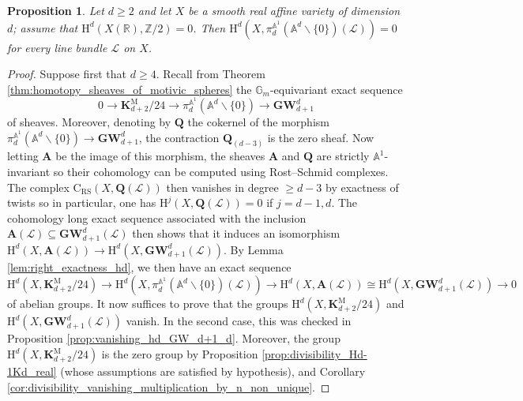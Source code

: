 \documentclass[11pt,leqno]{amsart}
\newcommand{\GW}{\mathbf{GW}}
\renewcommand{\1}{{\rm 1\hspace*{-0.4ex}%
\rule{0.1ex}{1.52ex}\hspace*{0.2ex}}}
\renewcommand{\Lc}{{\mathcal L}}
\newcommand{\Hr}{{\mathrm {H}}}
\newcommand{\<}[1]{{\langle}#1 {\rangle}}
\newcommand{\Rb}{\mathbb{R}}
\newcommand{\Abf}{\mathbf{A}}
\newcommand{\Cr}{\mathrm{C}}
\newcommand{\RS}{\mathrm{RS}}
\newcommand{\Zb}{\mathbb{Z}}
\newcommand{\Kbf}{\mathbf{K}}
\newcommand{\Abb}{\mathbb{A}}
\newcommand{\Mr}{\mathrm{M}}
\newcommand{\Qbf}{\mathbf{Q}}
\theoremstyle{plain}
\newtheorem{prop}[thm]{Proposition}
\theoremstyle{definition}
\theoremstyle{remark}
\numberwithin{equation}{section}
\begin{document}
\begin{prop}\label{prop:vanishing_cohomology_homotopy_sheaf}
Let $d\geq 2$ and let $X$ be a smooth real affine variety of dimension $d$; assume that $\Hr^d(X(\Rb),\Zb/2)=0$. Then $\Hr^d(X,\pi_d^{\Abb^1}(\Abb^d\smallsetminus \{0\})(\Lc))=0$ for every line bundle $\Lc$ on $X$.  
\end{prop}

\begin{proof}
Suppose first that $d\geq 4$. Recall from Theorem \ref{thm:homotopy_sheaves_of_motivic_spheres} the $\mathbb{G}_m$-equivariant exact sequence \[0\to\Kbf_{d+2}^\Mr/24\to\pi_d^{\Abb^1}(\Abb^d\smallsetminus \{0\})\to\GW_{d+1}^d\] of sheaves. Moreover, denoting by $\Qbf$ the cokernel of the morphism $\pi_d^{\Abb^1}(\Abb^d\smallsetminus \{0\})\to\GW_{d+1}^d$, the contraction $\Qbf_{(d-3)}$ is the zero sheaf. Now letting $\Abf$ be the image of this morphism, the sheaves $\Abf$ and $\Qbf$ are strictly $\Abb^1$-invariant so their cohomology can be computed using Rost--Schmid complexes. The complex $\Cr_\RS(X,\Qbf(\Lc))$ then vanishes in degree $\geq d-3$ by exactness of twists so in particular, one has $\Hr^j(X,\Qbf(\Lc))=0$ if $j=d-1,d$. The cohomology long exact sequence associated with the inclusion $\Abf(\Lc)\subseteq\GW_{d+1}^d(\Lc)$ then shows that it induces an isomorphism $\Hr^d(X,\Abf(\Lc))\to\Hr^d(X,\GW_{d+1}^d(\Lc))$. By Lemma \ref{lem:right_exactness_hd}, we then have an exact sequence \[\Hr^d(X,\Kbf_{d+2}^{\mathrm{M}}/24)\rightarrow\Hr^d(X,\pi_d^{\Abb^1}(\Abb^d\smallsetminus \{0\})(\Lc))\rightarrow\Hr^d(X,\Abf(\Lc))\cong\Hr^d(X,\GW_{d+1}^d(\Lc))\rightarrow 0\] of abelian groups. It now suffices to prove that the groups $\Hr^d(X,\Kbf_{d+2}^{\mathrm{M}}/24)$ and $\Hr^d(X,\GW_{d+1}^d(\Lc))$ vanish. In the second case, this was checked in Proposition \ref{prop:vanishing_hd_GW_d+1_d}. Moreover, the group $\Hr^d(X,\Kbf_{d+2}^\Mr/24)$ is the zero group by Proposition \ref{prop:divisibility_Hd-1Kd_real} (whose assumptions are satisfied by hypothesis), and Corollary \ref{cor:divisibility_vanishing_multiplication_by_n_non_unique}.


\end{proof}
\end{document}
